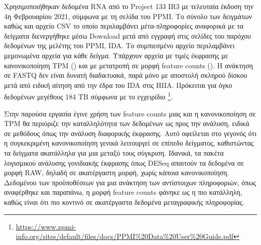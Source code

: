 \documentclass[12pt]{report}
\makeatletter
\let\oldchapter\chapter
\renewcommand{\chapter}{\@ifstar{\starchapter}{\nostarchapter}}
\newcommand{\starchapter}[1]{\oldchapter*{#1}\thispagestyle{mainstyle}}
\newcommand{\nostarchapter}[1]{\oldchapter{#1}\thispagestyle{mainstyle}}
\let\oldfootnote\footnote
\renewcommand{\footnote}[1]{\oldfootnote{\onehalfspacing #1}}
\makeatother
\begin{document}
    \chapter{Μέθοδοι}
    \par
        Χρησιμοποιήθηκαν δεδομένα RNA από το Project 133 IR3 με τελευταία έκδοση την 4η Φεβρουαρίου 2021, σύμφωνα με τη σελίδα του PPMI. Το σύνολο των δειγμάτων καθώς και αρχείο CSV το οποίο περιλαμβάνει μέτα-πληροφορίες αναφορικά με τα δείγματα διενεργήθηκε μέσω Download μετά από εγγραφή στις σελίδες του παρόχου δεδομένων της μελέτης του PPMI, IDA. Το συμπιεσμένο αρχείο περιλαμβάνει μεμονωμένα αρχεία για κάθε δείγμα. Υπάρχουν αρχεία με τιμές έκφρασης με κανονικοποίηση TPM (\emph{\cite{Zhao2021TPMRepository}}) και με μετατροπή σε μορφή feature counts (\emph{\cite{Liao2014FeatureCounts:Features}}). Η ανάκτηση σε FASTQ  δεν είναι δυνατή διαδικτυακά, παρά μόνο με αποστολή σκληρού δίσκου μετά από ειδική αίτηση από την έδρα του IDA στις ΗΠΑ. Πρόκειται για όγκο δεδομένων μεγέθους 184 TB σύμφωνα με το εγχειρίδιο \footnote{\url{https://www.ppmi-info.org/sites/default/files/docs/PPMI\%20Data\%20User\%20Guide.pdf}}.
    \par
        Στην παρούσα εργασία έγινε χρήση των feature counts μιας και η κανονικοποίηση σε TPM θα περιόριζε την καταλληλότητα των δεδομένων ως προς την ανάλυση, ειδικά σε μεθόδους όπως την ανάλυση διαφορικής έκφρασης. Αυτό οφείλεται στο γεγονός ότι η συγκεκριμένη κανονικοποίηση γενικά λειτουργεί σε επίπεδο δείγματος, καθιστώντας τα δείγματα ακατάλληλα για μια μεταξύ τους σύγκριση. Ιδανικά, τα πακέτα λογισμικού ανάλυσης γονιδιακής έκφρασης όπως DESeq απαιτούν τα δεδομένα σε μορφή RAW, δηλαδή σε ακατέργαστη μορφή, χωρίς κάποια κανονικοποίηση. Δεδομένου των προϋποθέσεων για μια ανάκτηση των αντίστοιχων πληροφοριών, όπως αναφέρθηκε και παραπάνω, η μορφή feature counts φάνηκε ως η πιο κατάλληλη, καθώς είναι ότι πιο κοντινό σε ακατέργαστα δεδομένα μεταγραφικής πληροφορίας.
        
\end{document}
